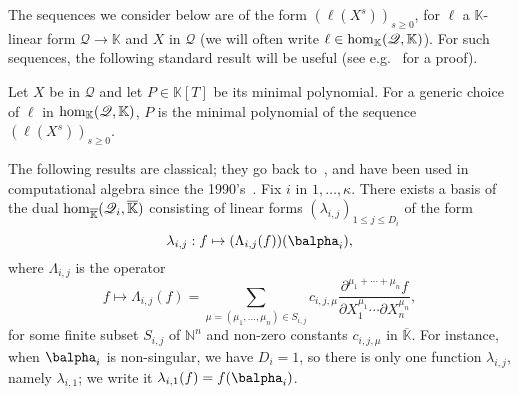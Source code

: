 \documentclass[12pt]{article}
\newcommand{\lf}{X}
\newcommand{\residueI}{\mathscr{Q}}
\def\dg{\kappa}
\def\N {\ensuremath{\mathbb{N}}}
\def\K{\mathbb{K}}
\def\K {\ensuremath{\mathbb{K}}}
\def\Kbar {{\ensuremath{\overline{\mathbb{K}}}}}
\def\D {\ensuremath{D}}
\begin{document}
The sequences we consider below are of the form $(\ell(\lf^s))_{s \ge
  0}$, for $\ell$ a $\K$-linear form $\residueI \to \K$ and $\lf$ in $\residueI$
(we will often write $\ell \in {\rm hom}_\K(\residueI,\K)$). For
such sequences, the following standard result will be useful
(see e.g.~\cite[Propositions~1 \& 2]{BoSaSc03} for a proof).
\begin{lemma}\label{lemma:minpoly}
  Let $\lf$ be in $\residueI$ and let $P \in \K[T]$ be its minimal
  polynomial. For a generic choice of $\ell$ in ${\rm hom}_\K(\residueI,\K)$,
  $P$ is the minimal polynomial of the sequence $(\ell(\lf^s))_{s \ge
    0}$.
\end{lemma}

The following results are classical; they go back
to~\cite{Macaulay16}, and have been used in computational algebra
since the 1990's~\cite{MaMoMo96,Mourrain97}. Fix $i$ in $1,\dots,\dg$.
There exists a basis of the dual ${\rm hom}_\Kbar(\residueI_i,\Kbar)$
consisting of linear forms $(\lambda_{i,j})_{1\le j \le \D_i}$ of the
form
$$\lambda_{i,j}: f \mapsto (\Lambda_{i,j}(f))(\balpha_i),$$
where $\Lambda_{i,j}$ is the operator
$$f \mapsto \Lambda_{i,j}(f) = \sum_{\mu=(\mu_1,\dots,\mu_n) \in
	S_{i,j}} c_{i,j,\mu} \frac{ \partial^{\mu_1 + \cdots + \mu_n} f}
{\partial X_1^{\mu_1} \cdots \partial X_n^{\mu_n}},$$ for some finite
subset $S_{i,j}$ of $\N^n$ and non-zero constants $c_{i,j,\mu}$ in
$\Kbar$. 
For instance, when $\balpha_i$ is non-singular, we have $D_i=1$, so
there is only one function $\lambda_{i,j}$, namely $\lambda_{i,1}$; we
write it $\lambda_{i,1}(f) = f(\balpha_i)$.
\end{document}
